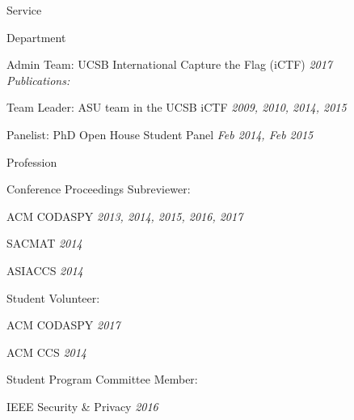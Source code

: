 
\begin{rSection}{Service}

  \begin{rBulletSubsection}{Department}

  \item Admin Team: UCSB International Capture the Flag (iCTF) \hfill \emph{2017}\\
        \emph{Publications:}~\cite{Trickel2017}

    \item Team Leader: ASU team in the UCSB iCTF \hfill \emph{2009, 2010, 2014, 2015}

    \item Panelist: PhD Open House Student Panel \hfill \emph{Feb 2014, Feb 2015}

  \end{rBulletSubsection}

  \begin{rBulletSubsection}{Profession}

    \item Conference Proceedings Subreviewer:
      \begin{rBulletList}

        \item ACM CODASPY \hfill \emph{2013, 2014, 2015, 2016, 2017}

        \item SACMAT \hfill \emph{2014}

        \item ASIACCS \hfill \emph{2014}

      \end{rBulletList}

    \item Student Volunteer:
      \begin{rBulletList}

        \item ACM CODASPY \hfill \emph{2017}

        \item ACM CCS \hfill \emph{2014}

      \end{rBulletList}

    \item Student Program Committee Member:
      \begin{rBulletList}

        \item IEEE Security \& Privacy \hfill \emph{2016}

      \end{rBulletList}

  \end{rBulletSubsection}


\end{rSection}
